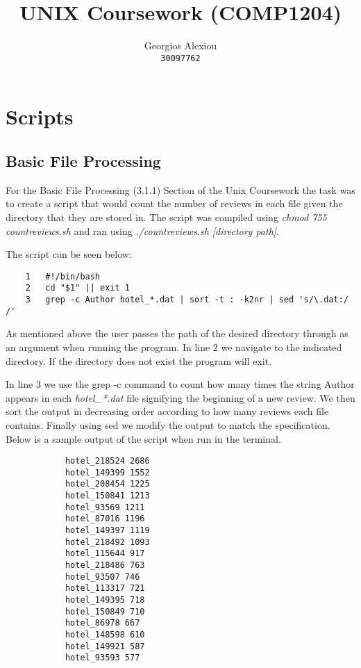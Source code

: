 \documentclass[titlepage]{article}
\title{UNIX Coursework (COMP1204)}
\author{Georgios Alexiou \\ {\tt 30097762}}
\begin{document}
\maketitle

    \section{Scripts}
    
        \subsection{Basic File Processing\label{bfp}}
        
            For the Basic File Processing (3.1.1) Section of the Unix Coursework the task was to create a script that would count the number of reviews in each file given the directory that they are stored in. The script was compiled using \textit{chmod 755 countreviews.sh} and ran using \textit{./countreviews.sh [directory path]}.
            
            The script can be seen below:
            
            \begin{lstlisting}
    1   #!/bin/bash
    2   cd "$1" || exit 1
    3   grep -c Author hotel_*.dat | sort -t : -k2nr | sed 's/\.dat:/ /'
            \end{lstlisting}
            
            As mentioned above the user passes the path of the desired directory through as an argument when running the program. In line 2 we navigate to the indicated directory. If the directory does not exist the program will exit. 
            
            In line 3 we use the grep -c command to count how many times the string Author appears in each \textit{hotel\_*.dat} file signifying the beginning of a new review. We then sort the output in decreasing order according to how many reviews each file contains. Finally using sed we modify the output to match the specification. Below is a sample output of the script when run in the terminal.
            
            \begin{lstlisting}
            hotel_218524 2686
            hotel_149399 1552
            hotel_208454 1225
            hotel_150841 1213
            hotel_93569 1211
            hotel_87016 1196
            hotel_149397 1119
            hotel_218492 1093
            hotel_115644 917
            hotel_218486 763
            hotel_93507 746
            hotel_113317 721
            hotel_149395 718
            hotel_150849 710
            hotel_86978 667
            hotel_148598 610
            hotel_149921 587
            hotel_93593 577
            \end{lstlisting}
            
\end{document}
